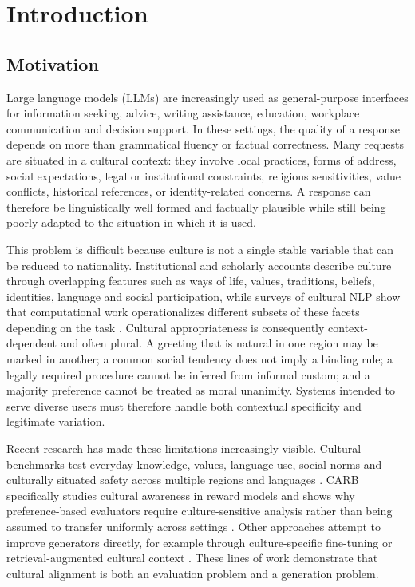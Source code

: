 \chapter{Introduction}
\label{ch:introduction}

\section{Motivation}

Large language models (LLMs) are increasingly used as general-purpose interfaces for information seeking, advice, writing assistance, education, workplace communication and decision support. In these settings, the quality of a response depends on more than grammatical fluency or factual correctness. Many requests are situated in a cultural context: they involve local practices, forms of address, social expectations, legal or institutional constraints, religious sensitivities, value conflicts, historical references, or identity-related concerns. A response can therefore be linguistically well formed and factually plausible while still being poorly adapted to the situation in which it is used.

This problem is difficult because culture is not a single stable variable that can be reduced to nationality. Institutional and scholarly accounts describe culture through overlapping features such as ways of life, values, traditions, beliefs, identities, language and social participation, while surveys of cultural NLP show that computational work operationalizes different subsets of these facets depending on the task \parencite{unesco2001culturaldiversity,cescr2009gc21,adilazuarda2024culture,liu2025culturallyaware,pawar2025culturalawareness}. Cultural appropriateness is consequently context-dependent and often plural. A greeting that is natural in one region may be marked in another; a common social tendency does not imply a binding rule; a legally required procedure cannot be inferred from informal custom; and a majority preference cannot be treated as moral unanimity. Systems intended to serve diverse users must therefore handle both contextual specificity and legitimate variation.

Recent research has made these limitations increasingly visible. Cultural benchmarks test everyday knowledge, values, language use, social norms and culturally situated safety across multiple regions and languages \parencite{myung2024blend,chiu2025culturalbench,rao2025normad,yin2024safeworld}. CARB specifically studies cultural awareness in reward models and shows why preference-based evaluators require culture-sensitive analysis rather than being assumed to transfer uniformly across settings \parencite{zhang2026carb}. Other approaches attempt to improve generators directly, for example through culture-specific fine-tuning or retrieval-augmented cultural context \parencite{li2024culturellm,seo2025valuesrag}. These lines of work demonstrate that cultural alignment is both an evaluation problem and a generation problem.

